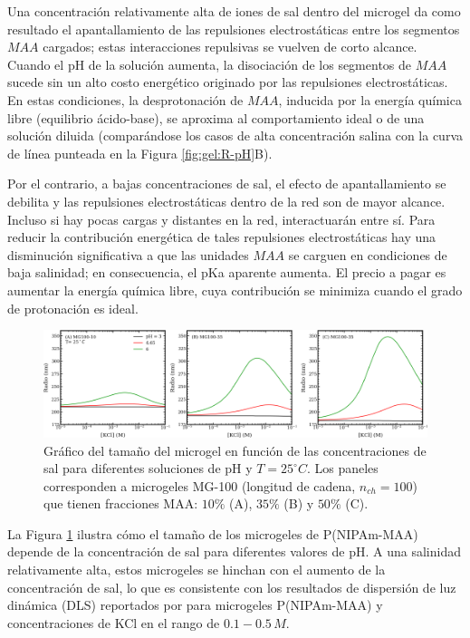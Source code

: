 Una concentraci\'on relativamente alta de iones de sal dentro del microgel da como resultado el apantallamiento de las repulsiones electrost\'aticas entre los segmentos $MAA$ cargados; estas interacciones repulsivas se vuelven de corto alcance.
Cuando el pH de la soluci\'on aumenta, la disociaci\'on de los segmentos de $MAA$ sucede sin un alto costo energ\'etico originado por las repulsiones electrost\'aticas.
En estas condiciones, la desprotonaci\'on de $MAA$, inducida por la energ\'ia qu\'imica libre (equilibrio \'acido-base), se aproxima al comportamiento ideal o de una soluci\'on diluida (compar\'andose los casos de alta concentraci\'on salina con la curva de l\'inea punteada en la Figura \ref{fig:gel:R-pH}B).

Por el contrario, a bajas concentraciones de sal, el efecto de apantallamiento se debilita y las repulsiones electrost\'aticas dentro de la red son de mayor alcance.
Incluso si hay pocas cargas y distantes en la red, interactuar\'an entre s\'i.
Para reducir la contribuci\'on energ\'etica de tales repulsiones electrost\'aticas hay una disminuci\'on significativa a que las unidades $MAA$ se carguen en condiciones de baja salinidad;
en consecuencia, el pKa aparente aumenta.
El precio a pagar es aumentar la energ\'ia qu\'imica libre, cuya contribuci\'on se minimiza cuando el grado de protonaci\'on es ideal.




\begin{figure}[!htb]
	\centering
	\includegraphics[width=1\linewidth]{Figures/graph-gel/R-cs.pdf}
	\caption{Gr\'afico del tama\~no del microgel en funci\'on de las concentraciones de sal para diferentes soluciones de pH y $T=25 ^\circ C$.
		Los paneles corresponden a microgeles MG-100 (longitud de cadena, $n_{ch}=100$) que tienen fracciones MAA: $10\%$ (A), $35\%$ (B) y $50\%$ (C).}
	\label{fig:gel:R-cs}
\end{figure}


La Figura \ref{fig:gel:R-cs} ilustra c\'omo el tama\~no de los microgeles de P(NIPAm-MAA) depende de la concentraci\'on de sal para diferentes valores de pH.
A una salinidad relativamente alta, estos microgeles se hinchan con el aumento de la concentraci\'on de sal, lo que es consistente con los resultados de dispersi\'on de luz din\'amica (DLS) reportados por \citet{Wong2009} para microgeles P(NIPAm-MAA) y concentraciones de KCl en el rango de $0.1-0.5\,M$.

